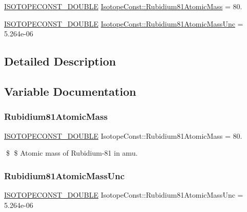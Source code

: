 \begin{DoxyCompactItemize}
\item 
\mbox{\hyperlink{group___isotope_const-_macros_ga8f45a7272ce02c0b4c65c44636ed719a}{I\+S\+O\+T\+O\+P\+E\+C\+O\+N\+S\+T\+\_\+\+D\+O\+U\+B\+LE}} \mbox{\hyperlink{group___isotope_const-_rubidium-_rb81_ga25dfb7066a63ae06912031a4433e3b4d}{Isotope\+Const\+::\+Rubidium81\+Atomic\+Mass}} = 80.
\item 
\mbox{\hyperlink{group___isotope_const-_macros_ga8f45a7272ce02c0b4c65c44636ed719a}{I\+S\+O\+T\+O\+P\+E\+C\+O\+N\+S\+T\+\_\+\+D\+O\+U\+B\+LE}} \mbox{\hyperlink{group___isotope_const-_rubidium-_rb81_ga4bf17b5c2b3e66f4c0bee6805d106ffd}{Isotope\+Const\+::\+Rubidium81\+Atomic\+Mass\+Unc}} = 5.\+264e-\/06
\end{DoxyCompactItemize}


\subsection{Detailed Description}


\subsection{Variable Documentation}
\mbox{\label{group___isotope_const-_rubidium-_rb81_ga25dfb7066a63ae06912031a4433e3b4d}} 
\subsubsection{\texorpdfstring{Rubidium81\+Atomic\+Mass}{Rubidium81AtomicMass}}
{\footnotesize\ttfamily \mbox{\hyperlink{group___isotope_const-_macros_ga8f45a7272ce02c0b4c65c44636ed719a}{I\+S\+O\+T\+O\+P\+E\+C\+O\+N\+S\+T\+\_\+\+D\+O\+U\+B\+LE}} Isotope\+Const\+::\+Rubidium81\+Atomic\+Mass = 80.}

\$ \$ Atomic mass of Rubidium-\/81 in amu. \mbox{\label{group___isotope_const-_rubidium-_rb81_ga4bf17b5c2b3e66f4c0bee6805d106ffd}} 
\subsubsection{\texorpdfstring{Rubidium81\+Atomic\+Mass\+Unc}{Rubidium81AtomicMassUnc}}
{\footnotesize\ttfamily \mbox{\hyperlink{group___isotope_const-_macros_ga8f45a7272ce02c0b4c65c44636ed719a}{I\+S\+O\+T\+O\+P\+E\+C\+O\+N\+S\+T\+\_\+\+D\+O\+U\+B\+LE}} Isotope\+Const\+::\+Rubidium81\+Atomic\+Mass\+Unc = 5.\+264e-\/06}

